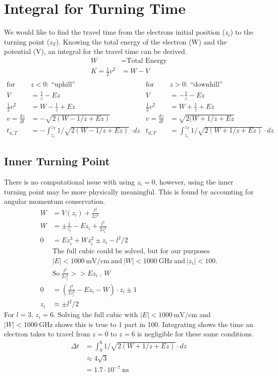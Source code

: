 \documentclass[aps,pra,preprint,groupedaddress]{revtex4-1}
\begin{document}
\section{\label{sec:Turning} Integral for Turning Time}

We would like to find the travel time from the electrons initial position ($z_i$) to the turning point ($z_T$). Knowing the total energy of the electron (W) and the potential (V), an integral for the travel time can be derived.
\begin{align*}
W & = \text{Total Energy} \\
K = \frac{1}{2} v^2 & =  W - V \\
\end{align*}
\begin{align*}
\text{for} ~ & z < 0: ~ \text{``uphill''} & \text{for} ~ & z > 0: ~ \text{``downhill''} \\
V & = \frac{1}{z} - Ez & V & = -\frac{1}{z} - Ez \\
\frac{1}{2} v^2 & = W - \frac{1}{z} + Ez & \frac{1}{2} v^2 & = W + \frac{1}{z} + Ez \\
v = \frac{dz}{dt} & = -\sqrt{2(W - 1/z + Ez)} & v = \frac{dz}{dt} & = \sqrt{2(W + 1/z + Ez} \\
t_{u,T} & = - \int_{z_i}^{z_T} 1/\sqrt{2(W - 1/z + Ez)} \cdot dz & t_{d,T} & = \int_{z_i}^{z_T} 1/\sqrt{2(W + 1/z + Ez)} \cdot dz
\end{align*}

\subsection{\label{sec:zi} Inner Turning Point}

There is no computational issue with using $z_i = 0$, however, using the inner turning point may be more physically meaningful. This is found by accounting for angular momentum conservation.
\begin{align*}
W & = V(z_i) + \frac{l^2}{2z^2} \\
W & = \pm \frac{1}{z_i} - Ez_i + \frac{l^2}{2z_i^2} \\
0 & = Ez_i^3 + Wz_i^2 \pm z_i - l^2/2 \\
& \text{The full cubic could be solved, but for our purposes} \\
 & |E| < 1000 ~ \text{mV/cm} ~ \text{and} ~ |W| < 1000 ~ \text{GHz} ~ \text{and} ~ |z_i| < 100. \\
 & \text{So} ~ \frac{l^2}{2z_i^2} >> Ez_i ~ , ~ W \\
0 & = \left(\frac{l^2}{2z_i^2} - Ez_i - W\right) \cdot z_i \pm 1 \\
z_i & \approx \pm l^2/2
\end{align*}
For $l = 3$, $z_i = 6$. Solving the full cubic with $|E| < 1000 ~ \text{mV/cm}$ and $|W| < 1000 ~ \text{GHz}$ shows this is true to 1 part in 100. Integrating shows the time an electron takes to travel from $z = 0$ to $z = 6$ is negligible for these same conditions.
\begin{align*}
\Delta t & = \int_0^6 1/\sqrt{2(W + 1/z + Ez)} \cdot dz \\
 & \approx 4\sqrt{3} \\
 & = 1.7 \cdot 10^{-7} ~ \text{ns} 
\end{align*}
\end{document}
